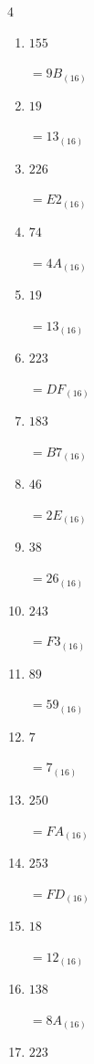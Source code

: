 \begin{multicols}{4}
\begin{enumerate}
  \item $155$

        $=9B_{(16)}$

  \item $19$

        $=13_{(16)}$

  \item $226$

        $=E2_{(16)}$

  \item $74$

        $=4A_{(16)}$

  \item $19$

        $=13_{(16)}$

  \item $223$

        $=DF_{(16)}$

  \item $183$

        $=B7_{(16)}$

  \item $46$

        $=2E_{(16)}$

  \item $38$

        $=26_{(16)}$

  \item $243$

        $=F3_{(16)}$

  \item $89$

        $=59_{(16)}$

\columnbreak %

  \item $7$

        $=7_{(16)}$

  \item $250$

        $=FA_{(16)}$

  \item $253$

        $=FD_{(16)}$

  \item $18$

        $=12_{(16)}$

  \item $138$

        $=8A_{(16)}$

  \item $223$


\end{enumerate}
\end{multicols}
